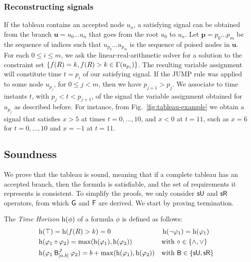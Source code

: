 \documentclass[acmsmall,screen]{acmart}
\begin{document}
\subsubsection{Reconstructing signals}
\label{sec:reconstructing-signals}
If the tableau contains an accepted node $u_n$, a satisfying signal
can be obtained from the branch $\mathbf{u} = u_0 \dots u_n$ that goes from the root $u_0$ to $u_n$.
Let $\textbf{p} = p_0 \dots p_m$ be the sequence of indices
such that $u_{p_0} \dots u_{p_m}$ is the sequence of poised nodes in $\mathbf{u}$.
For each $0 \leq i \leq m$, we ask the linear-real-arithmetic solver
for a solution to the constraint set $\set{f(R) = k, f(R) > k \in \Gamma(u_{p_i})}$.
The resulting variable assignment will constitute time $t = p_i$ of our satisfying signal.
If the \textsf{JUMP} rule was applied to some node $u_{p_j}$, for $0 \leq j < m$, then we have $p_{j+1} > p_j$.
We associate to time instants $t$, with $p_j < t < p_{j+1}$,
of the signal the variable assignment obtained for $u_{p_j}$ as described before.
For instance, from Fig.~\ref{fig:tableau-example} we obtain a signal
that satisfies $x > 5$ at times $t = 0, \dots, 10$, and $x < 0$ at $t = 11$,
such as $x = 6$ for $t = 0, \dots, 10$ and $x = -1$ at $t = 11$.

\color{black}


\subsection{Soundness}

We prove that the tableau is sound, meaning that if a complete tableau has an accepted branch,
then the formula is satisfiable, and the set of requirements it represents is consistent.
To simplify the proofs, we only consider $\suntilop$ and $\sreleaseop$ operators,
from which $\globop$ and $\evenop$ are derived.
We start by proving termination.

\begin{definition}%
\label{def:time-horizon}
The \emph{Time Horizon} $\horiz(\phi)$ of a formula $\phi$ is defined as follows:
\begin{align*}
&\horiz(\top) = \horiz(f(R) > k) = 0 &
&\horiz(\neg \varphi_1) = \horiz(\varphi_1) \\
&\horiz(\varphi_1 \circ \varphi_2) = \max(\horiz(\varphi_1), \horiz(\varphi_2)) && \text{with } \circ \in \set{\land, \lor} \\
&\horiz(\anybinop[J]{[a,b]}{\varphi_1}{\varphi_2}) = b + \max(\horiz(\varphi_1), \horiz(\varphi_2)) && \text{with } \mathsf{B} \in \set{\suntilop, \sreleaseop}
\end{align*}
\end{definition}
\end{document}
